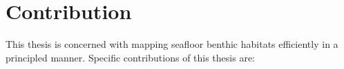 %		
%		
%		
		
	\newpage
	\section{Contribution}
	
		This thesis is concerned with mapping seafloor benthic habitats efficiently in a principled manner. Specific contributions of this thesis are:
		
